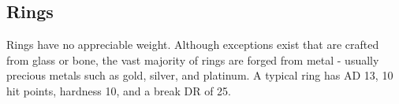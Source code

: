         \subsection{Rings}

             Rings have no appreciable weight.
            Although exceptions exist that are crafted from glass or bone, the vast majority of rings are forged from metal - usually precious metals such as gold, silver, and platinum.
            A typical ring has AD 13, 10 hit points, hardness 10, and a break DR of 25.

            \begin{comment}
                \begin{dtable}
                    \lcaption{Rings}
                    \begin{dtabularx}{\columnwidth}{>{\lcol}X l}
                        Ring & Market Price \\
                        \hline
                        Protection \plus1 & 2,000 gp \\
                        Feather falling & 2,200 gp \\
                        Climbing & 2,500 gp \\
                        Jumping & 2,500 gp \\
                        Sustenance & 2,500 gp \\
                        Swimming & 2,500 gp \\
                        Mind shielding & 8,000 gp \\
                        Protection \plus2 & 8,000 gp \\
                        Climbing, improved & 10,000 gp \\
                        Jumping, improved & 10,000 gp \\
                        Swimming, improved & 10,000 gp \\
                        Energy resistance, minor & 12,000 gp \\
                        Protection \plus3 & 18,000 gp \\
                        Energy resistance, major & 28,000 gp \\
                        Protection \plus4 & 32,000 gp \\
                        Energy resistance, greater & 44,000 gp \\
                        Protection \plus5 & 50,000 gp \\
                    \end{dtabularx}
                \end{dtable}
            \end{comment}

